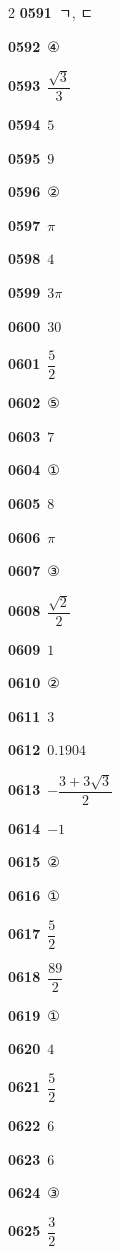 \documentclass[10pt,a4paper]{article}
\begin{document}
\begin{multicols}{2}
\noindent\textbf{0591}\ ㄱ, ㄷ\par
\noindent\textbf{0592}\ ④\par
\noindent\textbf{0593}\ $\dfrac{\sqrt{3}}{3}$\par
\noindent\textbf{0594}\ $5$\par
\noindent\textbf{0595}\ $9$\par
\noindent\textbf{0596}\ ②\par
\noindent\textbf{0597}\ $\pi$\par
\noindent\textbf{0598}\ $4$\par
\noindent\textbf{0599}\ $3\pi$\par
\noindent\textbf{0600}\ $30$\par
\noindent\textbf{0601}\ $\dfrac{5}{2}$\par
\noindent\textbf{0602}\ ⑤\par
\noindent\textbf{0603}\ $7$\par
\noindent\textbf{0604}\ ①\par
\noindent\textbf{0605}\ $8$\par
\noindent\textbf{0606}\ $\pi$\par
\noindent\textbf{0607}\ ③\par
\noindent\textbf{0608}\ $\dfrac{\sqrt{2}}{2}$\par
\noindent\textbf{0609}\ $1$\par
\noindent\textbf{0610}\ ②\par
\noindent\textbf{0611}\ $3$\par
\noindent\textbf{0612}\ $0.1904$\par
\noindent\textbf{0613}\ $-\dfrac{3+3\sqrt{3}}{2}$\par
\noindent\textbf{0614}\ $-1$\par
\noindent\textbf{0615}\ ②\par
\noindent\textbf{0616}\ ①\par
\noindent\textbf{0617}\ $\dfrac{5}{2}$\par
\noindent\textbf{0618}\ $\dfrac{89}{2}$\par
\noindent\textbf{0619}\ ①\par
\noindent\textbf{0620}\ $4$\par
\noindent\textbf{0621}\ $\dfrac{5}{2}$\par
\noindent\textbf{0622}\ $6$\par
\noindent\textbf{0623}\ $6$\par
\noindent\textbf{0624}\ ③\par
\noindent\textbf{0625}\ $\dfrac{3}{2}$\par

\end{multicols}
\end{document}
